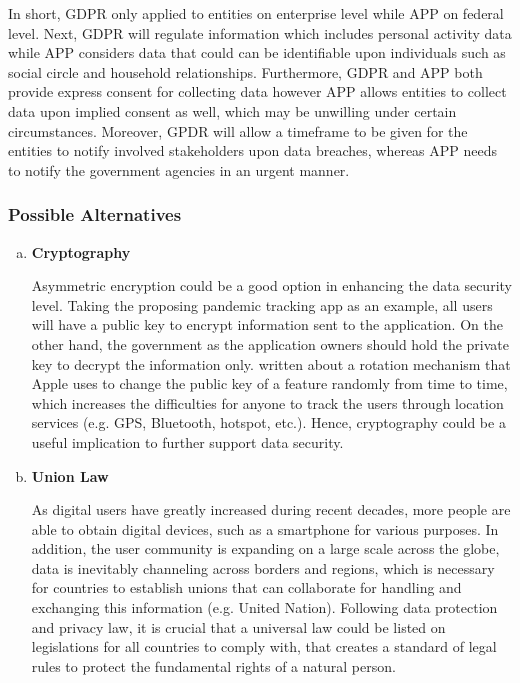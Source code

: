       \par In short, GDPR only applied to entities on enterprise level while APP on federal level. Next, GDPR
      will regulate information which includes personal activity data while APP considers data that could
      can be identifiable upon individuals such as social circle and household relationships. Furthermore,
      GDPR and APP both provide express consent for collecting data however APP allows entities to
      collect data upon implied consent as well, which may be unwilling under certain circumstances.
      Moreover, GPDR will allow a timeframe to be given for the entities to notify involved stakeholders
      upon data breaches, whereas APP needs to notify the government agencies in an urgent manner.

    \subsubsection{Possible Alternatives}
      \begin{enumerate}[a)]
        \item \textbf{Cryptography}
          \par Asymmetric encryption could be a good option in enhancing the data security level. Taking the proposing pandemic tracking app as an example, all users will have a public key to encrypt information sent to the application. On the other hand, the government as the application owners should hold the private key to decrypt the information only. \textcite{Ian7} written about a rotation mechanism that Apple uses to change the public key of a feature randomly from time to time, which increases the difficulties for anyone to track the users through location services (e.g. GPS, Bluetooth, hotspot, etc.). Hence, cryptography could be a useful implication to further support data security.
        \item \textbf{Union Law}
          \par As digital users have greatly increased during recent decades, more people are able to obtain digital devices, such as a smartphone for various purposes. In addition, the user community is expanding on a large scale across the globe, data is inevitably channeling across borders and regions, which is necessary for countries to establish unions that can collaborate for handling and exchanging this information (e.g. United Nation). Following data protection and privacy law, it is crucial that a universal law could be listed on legislations for all countries to comply with, that creates a standard of legal rules to protect the fundamental rights of a natural person.
      \end{enumerate}

